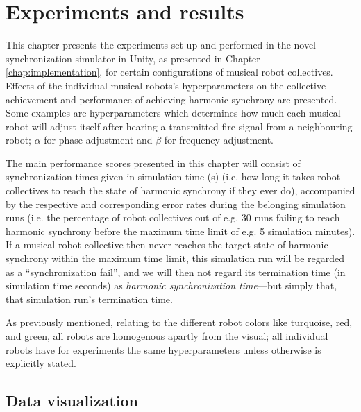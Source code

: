 \chapter{Experiments and results}
\label{chap:experiments_and_results}






This chapter presents the experiments set up and performed in the novel synchronization simulator in Unity, as presented in Chapter \ref{chap:implementation}, for certain configurations of musical robot collectives. Effects of the individual musical robots's hyperparameters on the collective achievement and performance of achieving harmonic synchrony are presented. Some examples are hyperparameters which determines how much each musical robot will adjust itself after hearing a transmitted fire signal from a neighbouring robot; $\alpha$ for phase adjustment and $\beta$ for frequency adjustment.

The main performance scores presented in this chapter will consist of synchronization times given in simulation time (s) (i.e. how long it takes robot collectives to reach the state of harmonic synchrony if they ever do), accompanied by the respective and corresponding error rates during the belonging simulation runs (i.e. the percentage of robot collectives out of e.g. 30 runs failing to reach harmonic synchrony before the maximum time limit of e.g. 5 simulation minutes). If a musical robot collective then never reaches the target state of harmonic synchrony within the maximum time limit, this simulation run will be regarded as a ``synchronization fail'', and we will then not regard its termination time (in simulation time seconds) as \textit{harmonic synchronization time}—but simply that, that simulation run's termination time.

As previously mentioned, relating to the different robot colors like turquoise, red, and green, all robots are homogenous apartly from the visual; all individual robots have for experiments the same hyperparameters unless otherwise is explicitly stated.



\section{Data visualization}

